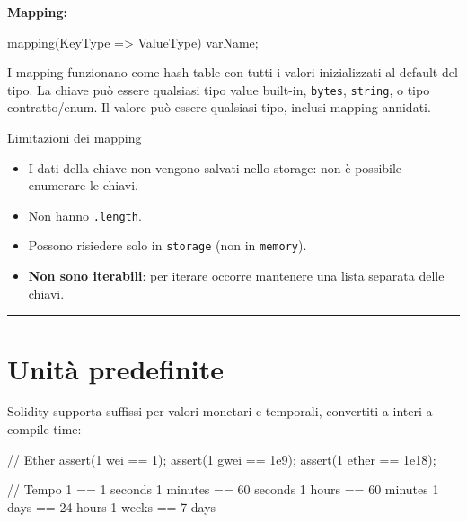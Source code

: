 \documentclass[
  italian,
  openany]{book}
\newenvironment{Shaded}{\begin{snugshade}}{\end{snugshade}}
\newcommand{\NormalTok}[1]{#1}
\providecommand{\tightlist}{%
  \setlength{\itemsep}{0pt}\setlength{\parskip}{0pt}}
\begin{document}
\textbf{Mapping:}

\begin{Shaded}
\begin{Highlighting}[]
\NormalTok{mapping(KeyType =\textgreater{} ValueType) varName;}
\end{Highlighting}
\end{Shaded}

I mapping funzionano come hash table con tutti i valori inizializzati al
default del tipo. La chiave può essere qualsiasi tipo value built-in,
\texttt{bytes}, \texttt{string}, o tipo contratto/enum. Il valore può
essere qualsiasi tipo, inclusi mapping annidati.

\begin{calloutwarning}{Limitazioni dei mapping}

\begin{itemize}
\tightlist
\item
  I dati della chiave non vengono salvati nello storage: non è possibile
  enumerare le chiavi.
\item
  Non hanno \texttt{.length}.
\item
  Possono risiedere solo in \texttt{storage} (non in \texttt{memory}).
\item
  \textbf{Non sono iterabili}: per iterare occorre mantenere una lista
  separata delle chiavi.
\end{itemize}

\end{calloutwarning}

\begin{center}\rule{0.5\linewidth}{0.5pt}\end{center}

\section{Unità predefinite}\label{unituxe0-predefinite}

Solidity supporta suffissi per valori monetari e temporali, convertiti a
interi a compile time:

\begin{Shaded}
\begin{Highlighting}[]
\NormalTok{// Ether}
\NormalTok{assert(1 wei   == 1);}
\NormalTok{assert(1 gwei  == 1e9);}
\NormalTok{assert(1 ether == 1e18);}

\NormalTok{// Tempo}
\NormalTok{1 == 1 seconds}
\NormalTok{1 minutes == 60 seconds}
\NormalTok{1 hours   == 60 minutes}
\NormalTok{1 days    == 24 hours}
\NormalTok{1 weeks   == 7 days}
\end{Highlighting}
\end{Shaded}
\end{document}
